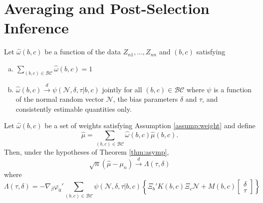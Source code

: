 \section{Averaging and Post-Selection Inference}


\begin{assump} Let $\widehat{\omega}(b,c)$ be a function of the data $Z_{n1}, \hdots, Z_{nn}$ and $(b,c)$ satisfying
	\begin{enumerate}[(a)] 
		\item $\sum_{(b,c) \in \mathcal{BC}} \widehat{\omega}(b,c) = 1$
		\item $\widehat{\omega}(b,c) \overset{d}{\rightarrow} \psi(\mathscr{N}, \delta, \tau|b,c)$ jointly for all $(b,c) \in \mathcal{BC}$ where $\psi$ is a function of the normal random vector $\mathscr{N}$, the bias parameters $\delta$ and $\tau$, and consistently estimable quantities only.
	\end{enumerate}
\label{assump:weight}
\end{assump}

\begin{cor}
Let $\widehat{\omega}(b,c)$ be a set of weights satisfying Assumption \ref{assump:weight} and define
	$$\widehat{\mu} = \sum_{(b,c) \in \mathcal{BC}} \widehat{\omega}(b,c) \widehat{\mu}(b,c).$$
Then, under the hypotheses of Theorem \ref{thm:asymp},  
	$$\sqrt{n}\left(\widehat{\mu} - \mu_n\right) \overset{d}{\rightarrow} \Lambda(\tau,\delta)$$
where
	\begin{equation}
		\Lambda(\tau,\delta) = -\nabla_\beta\varphi_0' \sum_{(b,c) \in \mathcal{BC}} \psi(\mathscr{N},\delta, \tau|b,c) \left\{\Xi_b' K(b,c) \Xi_c \mathscr{N} + M(b,c)  \left[\begin{array}{c}\delta \\ \tau \end{array} \right]\right\}
	\end{equation}
\end{cor}



